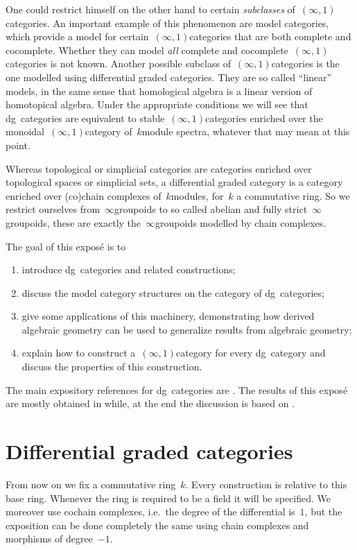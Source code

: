 \begin{refsection}
One could restrict himself on the other hand to certain \emph{subclasses} of~$(\infty,1)$\dash categories. An important example of this phenomenon are model categories, which provide a model for certain~$(\infty,1)$\dash categories that are both complete and cocomplete. Whether they can model \emph{all} complete and cocomplete~$(\infty,1)$\dash categories is not known. Another possible subclass of~$(\infty,1)$\dash categories is the one modelled using differential graded categories. They are so called ``linear'' models, in the same sense that homological algebra is a linear version of homotopical algebra. Under the appropriate conditions we will see that dg~categories are equivalent to stable~$(\infty,1)$\dash categories enriched over the monoidal~$(\infty,1)$\dash category of~$k$\dash module spectra, whatever that may mean at this point.

Whereas topological or simplicial categories are categories enriched over topological spaces or simplicial sets, a differential graded category is a category enriched over (co)chain complexes of~$k$\dash modules, for~$k$ a commutative ring. So we restrict ourselves from~$\infty$\dash groupoids to so called abelian and fully strict~$\infty$\dash groupoids, these are exactly the~$\infty$\dash groupoids modelled by chain complexes.

The goal of this expos\'e is to
\begin{enumerate}
  \item introduce dg~categories and related constructions;
  \item discuss the model category structures on the category of dg~categories;
  \item give some applications of this machinery, demonstrating how derived algebraic geometry can be used to generalize results from algebraic geometry;
  \item explain how to construct a~$(\infty,1)$\dash category for every dg~category and discuss the properties of this construction.
\end{enumerate}

The main expository references for dg~categories are \cite{lnm2008,keller}. The results of this expos\'e are mostly obtained in \cite{toen} while, at the end the discussion is based on \cite{ha}.


\section{Differential graded categories}
From now on we fix a commutative ring~$k$. Every construction is relative to this base ring. Whenever the ring is required to be a field it will be specified. We moreover use cochain complexes, i.e.\ the degree of the differential is~$1$, but the exposition can be done completely the same using chain complexes and morphisms of degree~$-1$.


\end{refsection}
